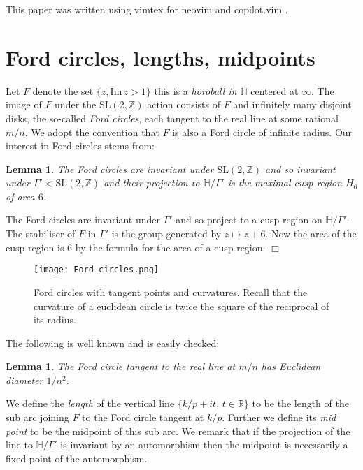 \documentclass[12pt,a4paper]{amsart}
\newtheorem{lem}[thm]{Lemma}
\def\HH{\mathbb{H}}
\def\im{\mathrm{Im}\,}
\def\xx{\HH/\Gamma'}
\def\ZZ{\mathbb{Z}}
\def\RR{\mathbb{R}}
\def\sl2{\mathrm{SL}(2, \ZZ)}
\begin{document}
This paper was written using vimtex for neovim and copilot.vim \cite{copilot}.



\section{Ford circles, lengths, midpoints} 
\label{lengths}

Let $F$ denote the set  $\{ z, \im z > 1\}$ this is a \textit{horoball in
$\HH$} centered at $\infty$. The image of $F$ under the $\sl2$ action consists
of $F$ and infinitely many disjoint disks, the so-called \textit{Ford
circles}, each tangent to the real line at some rational $m/n$. We adopt the
convention that $F$ is also a Ford circle of infinite radius. Our interest in
Ford circles stems from:

\begin{lem} 

	The Ford circles are invariant under $\sl2$ and so invariant under
	$\Gamma'< \sl2$ and their projection to $\xx$ is the maximal cusp
	region $H_6$ of area $6$. 

\end{lem}

\proof
The Ford circles are invariant under $\Gamma'$ and so project to a cusp
region on $\xx$. The stabiliser of $F$ in $\Gamma'$ is the group generated by
$z \mapsto z + 6$. Now the area of the cusp region is $6$ by the formula for
the area of a cusp region. 
\hfill $\Box$

\begin{figure}[ht]
\begin{center}
\texttt{[image: Ford-circles.png]} 
\end{center}
\caption{Ford circles with tangent points and curvatures.
Recall that the curvature of a euclidean circle is twice  the square of  the reciprocal of its radius.}
\end{figure}

The following is well known and is easily checked:

\begin{lem}\label{ford}
The Ford circle tangent to the real line at $m/n$
has Euclidean diameter $1/n^2$.
\end{lem}


We define the \textit{length} of the vertical line 
$\{ k/p + i t,\, t \in \RR \}$
to be the length of the  sub arc joining 
$F$ to the Ford circle tangent at $k/p$.
Further we define its  \textit{mid point} to be the midpoint of this sub arc.
We remark that if the projection of the line to $\xx$
is invariant by an automorphism 
then the midpoint is necessarily a fixed point of the automorphism.
\end{document}
